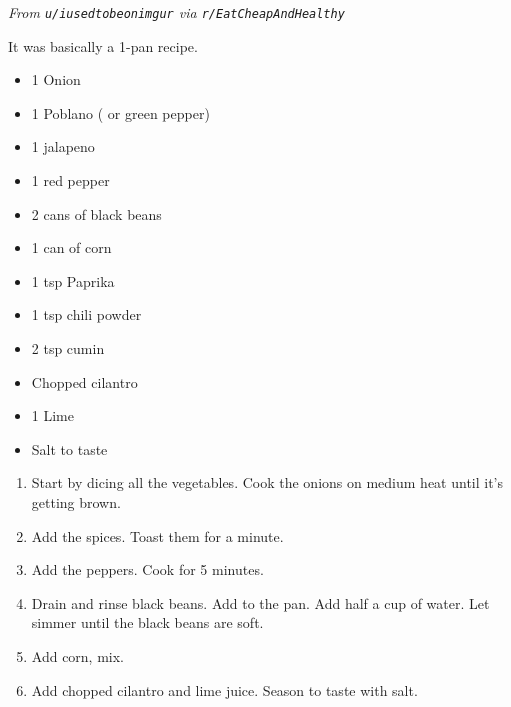 
\textit{From \texttt{\small u/iusedtobeonimgur} via \texttt{\small r/EatCheapAndHealthy}}

It was basically a 1-pan recipe.
\ingredients
\begin{itemize}
		\item 1 Onion
		\item 1 Poblano ( or green pepper)
		\item 1 jalapeno
		\item 1 red pepper
		\item 2 cans of black beans
		\item 1 can of corn
		\item 1 tsp Paprika
		\item 1 tsp chili powder
		\item 2 tsp cumin
		\item Chopped cilantro
		\item 1 Lime
		\item Salt to taste
\end{itemize}

\instructions
\begin{enumerate}
		\item Start by dicing all the vegetables. Cook the onions on medium heat until it's getting brown.
		\item Add the spices. Toast them for a minute.
		\item Add the peppers. Cook for 5 minutes.
		\item Drain and rinse black beans. Add to the pan. Add half a cup of water. Let simmer until the black beans are soft.
		\item Add corn, mix.
		\item Add chopped cilantro and lime juice. Season to taste with salt.
\end{enumerate}
